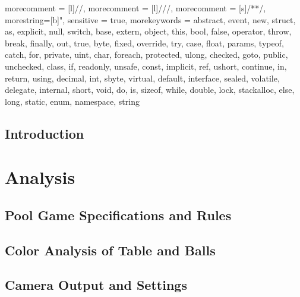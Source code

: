 
\usepackage{float}
\usepackage{graphicx}
\usepackage{listings}
\usepackage{subfig}

{
 morecomment = [l]{//}, 
 morecomment = [l]{///},
 morecomment = [s]{/*}{*/},
 morestring=[b]", 
 sensitive = true,
 morekeywords = {abstract,  event,  new,  struct,
   as,  explicit,  null,  switch,
   base,  extern,  object,  this,
   bool,  false,  operator,  throw,
   break,  finally,  out,  true,
   byte,  fixed,  override,  try,
   case,  float,  params,  typeof,
   catch,  for,  private,  uint,
   char,  foreach,  protected,  ulong,
   checked,  goto,  public,  unchecked,
   class,  if,  readonly,  unsafe,
   const,  implicit,  ref,  ushort,
   continue,  in,  return,  using,
   decimal,  int,  sbyte,  virtual,
   default,  interface,  sealed,  volatile,
   delegate,  internal,  short,  void,
   do,  is,  sizeof,  while,
   double,  lock,  stackalloc,   
   else,  long,  static,   
   enum,  namespace,  string}
}
\lstset{language=CSharp}


 







\tableofcontents

\chapter{Introduction}
	

\part{Analysis}
	
	\label{sec:analysis}
	
	\chapter{Pool Game Specifications and Rules}
			\label{sec:rules}
					
	
	\chapter{Color Analysis of Table and Balls}
		\label{sec:analysisballstable}
		
	
	\chapter{Camera Output and Settings}
		\label{sec:camera}
		
					

